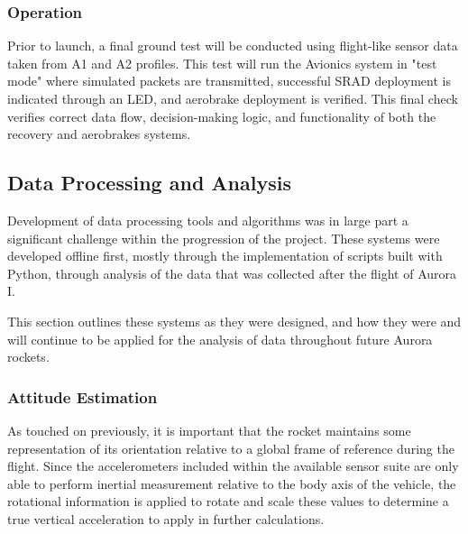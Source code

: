 \subsubsection{Operation}
Prior to launch, a final ground test will be conducted using flight-like sensor data taken from A1 and A2 profiles. This test will run the Avionics system in "test mode" where simulated packets are transmitted, successful SRAD deployment is indicated through an LED, and aerobrake deployment is verified. This final check verifies correct data flow, decision-making logic, and functionality of both the recovery and aerobrakes systems. 


\subsection{Data Processing and Analysis}
Development of data processing tools and algorithms was in large part a significant challenge within the progression of the project. These systems were developed offline first, mostly through the implementation of scripts built with Python, through analysis of the data that was collected after the flight of Aurora I. 

This section outlines these systems as they were designed, and how they were and will continue to be applied for the analysis of data throughout future Aurora rockets.

\subsubsection{Attitude Estimation}
As touched on previously, it is important that the rocket maintains some representation of its orientation relative to a global frame of reference during the flight. Since the accelerometers included within the available sensor suite are only able to perform inertial measurement relative to the body axis of the vehicle, the rotational information is applied to rotate and scale these values to determine a true vertical acceleration to apply in further calculations.

